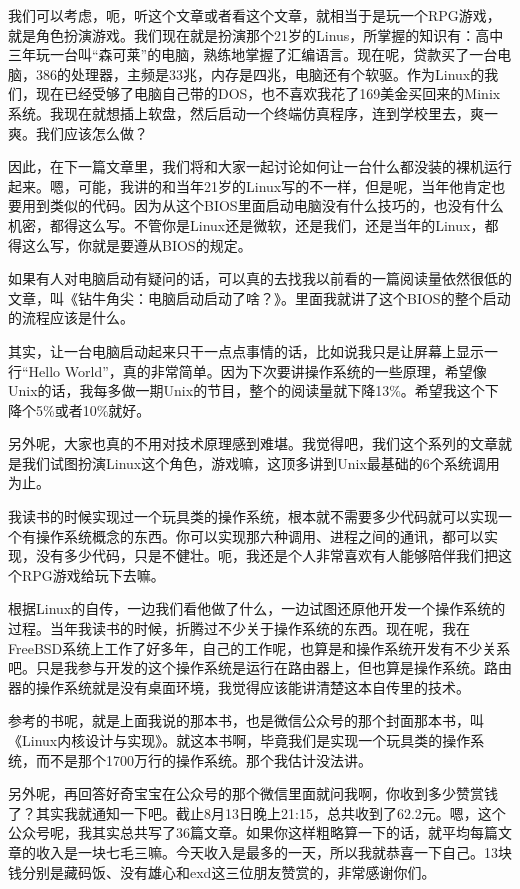 \documentclass[
  letterpaper,
  DIV=11,
  numbers=noendperiod]{scrreprt}
\begin{document}
我们可以考虑，呃，听这个文章或者看这个文章，就相当于是玩一个RPG游戏，就是角色扮演游戏。我们现在就是扮演那个21岁的Linus，所掌握的知识有：高中三年玩一台叫``森可莱''的电脑，熟练地掌握了汇编语言。现在呢，贷款买了一台电脑，386的处理器，主频是33兆，内存是四兆，电脑还有个软驱。作为Linux的我们，现在已经受够了电脑自己带的DOS，也不喜欢我花了169美金买回来的Minix系统。我现在就想插上软盘，然后启动一个终端仿真程序，连到学校里去，爽一爽。我们应该怎么做？

因此，在下一篇文章里，我们将和大家一起讨论如何让一台什么都没装的裸机运行起来。嗯，可能，我讲的和当年21岁的Linux写的不一样，但是呢，当年他肯定也要用到类似的代码。因为从这个BIOS里面启动电脑没有什么技巧的，也没有什么机密，都得这么写。不管你是Linux还是微软，还是我们，还是当年的Linux，都得这么写，你就是要遵从BIOS的规定。

如果有人对电脑启动有疑问的话，可以真的去找我以前看的一篇阅读量依然很低的文章，叫《钻牛角尖：电脑启动启动了啥？》。里面我就讲了这个BIOS的整个启动的流程应该是什么。

其实，让一台电脑启动起来只干一点点事情的话，比如说我只是让屏幕上显示一行``Hello
World''，真的非常简单。因为下次要讲操作系统的一些原理，希望像Unix的话，我每多做一期Unix的节目，整个的阅读量就下降13\%。希望我这个下降个5\%或者10\%就好。

另外呢，大家也真的不用对技术原理感到难堪。我觉得吧，我们这个系列的文章就是我们试图扮演Linux这个角色，游戏嘛，这顶多讲到Unix最基础的6个系统调用为止。

我读书的时候实现过一个玩具类的操作系统，根本就不需要多少代码就可以实现一个有操作系统概念的东西。你可以实现那六种调用、进程之间的通讯，都可以实现，没有多少代码，只是不健壮。呃，我还是个人非常喜欢有人能够陪伴我们把这个RPG游戏给玩下去嘛。

根据Linux的自传，一边我们看他做了什么，一边试图还原他开发一个操作系统的过程。当年我读书的时候，折腾过不少关于操作系统的东西。现在呢，我在FreeBSD系统上工作了好多年，自己的工作呢，也算是和操作系统开发有不少关系吧。只是我参与开发的这个操作系统是运行在路由器上，但也算是操作系统。路由器的操作系统就是没有桌面环境，我觉得应该能讲清楚这本自传里的技术。

参考的书呢，就是上面我说的那本书，也是微信公众号的那个封面那本书，叫《Linux内核设计与实现》。就这本书啊，毕竟我们是实现一个玩具类的操作系统，而不是那个1700万行的操作系统。那个我估计没法讲。

另外呢，再回答好奇宝宝在公众号的那个微信里面就问我啊，你收到多少赞赏钱了？其实我就通知一下吧。截止8月13日晚上21:15，总共收到了62.2元。嗯，这个公众号呢，我其实总共写了36篇文章。如果你这样粗略算一下的话，就平均每篇文章的收入是一块七毛三嘛。今天收入是最多的一天，所以我就恭喜一下自己。13块钱分别是藏码饭、没有雄心和exd这三位朋友赞赏的，非常感谢你们。
\end{document}
